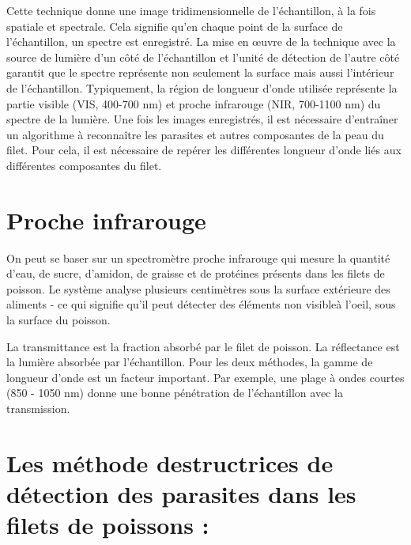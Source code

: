 \documentclass[12pt,a4paper]{article}
\begin{document}
Cette technique donne une image tridimensionnelle de l'échantillon, à la fois spatiale et spectrale. Cela signifie qu'en chaque point de la surface de l'échantillon, un spectre est enregistré. La mise en œuvre de la technique avec la source de lumière d'un côté de l'échantillon et l'unité de détection de l'autre côté garantit que le spectre représente non seulement la surface mais aussi l'intérieur de l'échantillon.
Typiquement, la région de longueur d'onde utilisée représente la partie visible (VIS, 400-700 nm) et proche infrarouge (NIR, 700-1100 nm) du spectre de la lumière.
Une fois les images enregistrés, il est nécessaire d'entraîner un algorithme à reconnaître les parasites et autres composantes de la peau du filet.
Pour cela, il est nécessaire de repérer les différentes longueur d'onde liés aux différentes composantes du filet.


\section{Proche infrarouge}

On peut se baser sur un spectromètre proche infrarouge qui mesure la quantité d'eau, de sucre, d'amidon, de graisse et de protéines présents dans les filets de poisson. Le système analyse plusieurs centimètres sous la surface extérieure des aliments - ce qui signifie qu'il peut détecter des éléments non visibleà l'oeil, sous la surface du poisson.


La transmittance est la fraction absorbé par le filet de poisson. La réflectance est la lumière absorbée par l'échantillon.
Pour les deux méthodes, la gamme de longueur d'onde est un facteur important. Par exemple, une plage à ondes courtes (850 - 1050 nm) donne une bonne pénétration de l'échantillon avec la transmission.


\newpage
\section {Les  méthode destructrices de détection des parasites dans les filets de poissons :}
\end{document}
